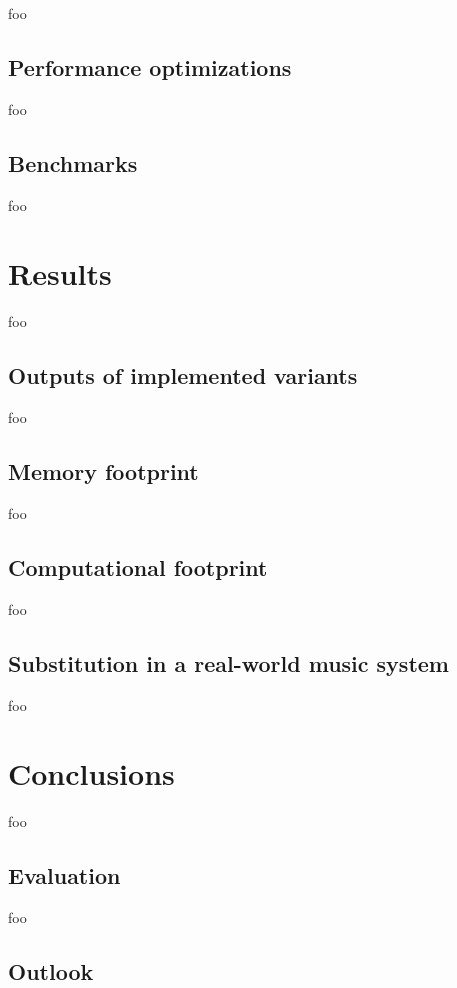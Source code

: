 \documentclass[letter,12pt]{article}
\begin{document}
foo

\subsection{Performance optimizations}

foo

\subsection{Benchmarks}

foo

\section{Results}

foo

\subsection{Outputs of implemented variants}

foo

\subsection{Memory footprint}

foo

\subsection{Computational footprint}

foo

\subsection{Substitution in a real-world music system}

foo

\section{Conclusions}

foo

\subsection{Evaluation}

foo

\subsection{Outlook}
\end{document}
